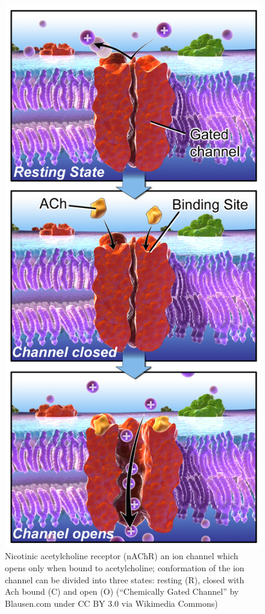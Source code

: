 \documentclass[
  letterpaper,
  DIV=11,
  numbers=noendperiod]{scrreprt}
\begin{document}
\begin{figure}

{\centering \includegraphics{./ch10/ChemicallyGatedChannel.png}

}

\caption{Nicotinic acetylcholine receptor (nAChR) an ion channel which
opens only when bound to acetylcholine; conformation of the ion channel
can be divided into three states: resting (R), closed with Ach bound (C)
and open (O) (``Chemically Gated Channel'' by Blausen.com under CC BY
3.0 via Wikimedia Commons)}

\end{figure}
\end{document}
